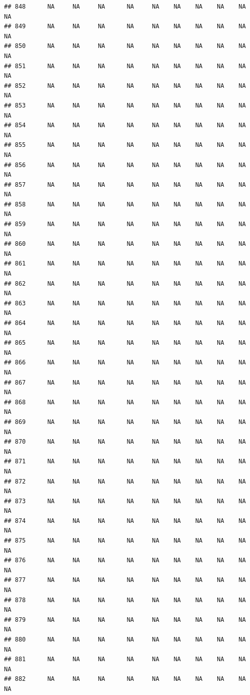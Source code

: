 \documentclass{article}\usepackage{graphicx, color}
\makeatletter
\newenvironment{kframe}{%
 \def\at@end@of@kframe{}%
 \ifinner\ifhmode%
  \def\at@end@of@kframe{\end{minipage}}%
  \begin{minipage}{\columnwidth}%
 \fi\fi%
 \def\FrameCommand##1{\hskip\@totalleftmargin \hskip-\fboxsep
 \colorbox{shadecolor}{##1}\hskip-\fboxsep
     \hskip-\linewidth \hskip-\@totalleftmargin \hskip\columnwidth}%
 \MakeFramed {\advance\hsize-\width
   \@totalleftmargin\z@ \linewidth\hsize
   \@setminipage}}%
 {\par\unskip\endMakeFramed%
 \at@end@of@kframe}
\newenvironment{knitrout}{}{} %
\makeatother
\begin{document}
\begin{knitrout}
\begin{kframe}
\begin{verbatim}
## 848      NA     NA     NA      NA     NA    NA    NA    NA    NA     NA
## 849      NA     NA     NA      NA     NA    NA    NA    NA    NA     NA
## 850      NA     NA     NA      NA     NA    NA    NA    NA    NA     NA
## 851      NA     NA     NA      NA     NA    NA    NA    NA    NA     NA
## 852      NA     NA     NA      NA     NA    NA    NA    NA    NA     NA
## 853      NA     NA     NA      NA     NA    NA    NA    NA    NA     NA
## 854      NA     NA     NA      NA     NA    NA    NA    NA    NA     NA
## 855      NA     NA     NA      NA     NA    NA    NA    NA    NA     NA
## 856      NA     NA     NA      NA     NA    NA    NA    NA    NA     NA
## 857      NA     NA     NA      NA     NA    NA    NA    NA    NA     NA
## 858      NA     NA     NA      NA     NA    NA    NA    NA    NA     NA
## 859      NA     NA     NA      NA     NA    NA    NA    NA    NA     NA
## 860      NA     NA     NA      NA     NA    NA    NA    NA    NA     NA
## 861      NA     NA     NA      NA     NA    NA    NA    NA    NA     NA
## 862      NA     NA     NA      NA     NA    NA    NA    NA    NA     NA
## 863      NA     NA     NA      NA     NA    NA    NA    NA    NA     NA
## 864      NA     NA     NA      NA     NA    NA    NA    NA    NA     NA
## 865      NA     NA     NA      NA     NA    NA    NA    NA    NA     NA
## 866      NA     NA     NA      NA     NA    NA    NA    NA    NA     NA
## 867      NA     NA     NA      NA     NA    NA    NA    NA    NA     NA
## 868      NA     NA     NA      NA     NA    NA    NA    NA    NA     NA
## 869      NA     NA     NA      NA     NA    NA    NA    NA    NA     NA
## 870      NA     NA     NA      NA     NA    NA    NA    NA    NA     NA
## 871      NA     NA     NA      NA     NA    NA    NA    NA    NA     NA
## 872      NA     NA     NA      NA     NA    NA    NA    NA    NA     NA
## 873      NA     NA     NA      NA     NA    NA    NA    NA    NA     NA
## 874      NA     NA     NA      NA     NA    NA    NA    NA    NA     NA
## 875      NA     NA     NA      NA     NA    NA    NA    NA    NA     NA
## 876      NA     NA     NA      NA     NA    NA    NA    NA    NA     NA
## 877      NA     NA     NA      NA     NA    NA    NA    NA    NA     NA
## 878      NA     NA     NA      NA     NA    NA    NA    NA    NA     NA
## 879      NA     NA     NA      NA     NA    NA    NA    NA    NA     NA
## 880      NA     NA     NA      NA     NA    NA    NA    NA    NA     NA
## 881      NA     NA     NA      NA     NA    NA    NA    NA    NA     NA
## 882      NA     NA     NA      NA     NA    NA    NA    NA    NA     NA

\end{verbatim}
\end{kframe}
\end{knitrout}
\end{document}
